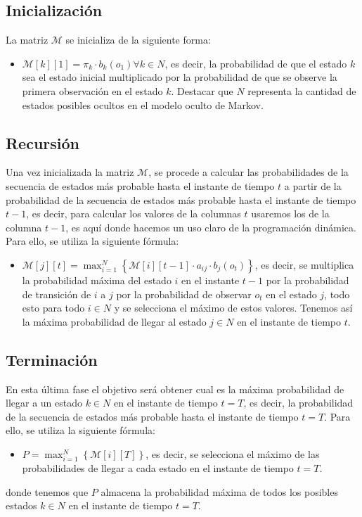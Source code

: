 \documentclass[11pt,openany]{book}
\begin{document}
\subsection{Inicialización}
La matriz $\mathscr{M}$ se inicializa de la siguiente forma:
\begin{itemize}
      \item $\mathscr{M}[k][1] = \pi_k \cdot b_k(o_1) \forall k \in N$, es decir, la probabilidad de que el estado $k$ sea el estado inicial multiplicado por la probabilidad de que se observe
      la primera observación en el estado $k$. Destacar que $N$ representa la cantidad de estados posibles ocultos en el modelo oculto de Markov.
\end{itemize}

\subsection{Recursión}
Una vez inicializada la matriz $\mathscr{M}$, se procede a calcular las probabilidades de la secuencia de estados más probable hasta el instante de tiempo $t$ a partir de la probabilidad
de la secuencia de estados más probable hasta el instante de tiempo $t-1$, es decir, para calcular los valores de la columnas $t$ usaremos los de la columna $t-1$, es aquí donde hacemos
un uso claro de la programación dinámica. Para ello, se utiliza la siguiente fórmula:
\begin{itemize}
      \item $\mathscr{M}[j][t] = \max_{i=1}^{N} \left\{ \mathscr{M}[i][t-1] \cdot a_{ij} \cdot b_j(o_t) \right\}$, es decir, se multiplica la probabilidad máxima del estado $i$ en
      el instante $t-1$ por la probabilidad de transición de $i$ a $j$ por la probabilidad de observar $o_t$ en el estado $j$, todo esto para todo $i\in N$ y se 
      selecciona el máximo de estos valores. Tenemos así la máxima probabilidad de llegar al estado $j\in N$ en el instante de tiempo $t$.
\end{itemize}
\subsection{Terminación}
En esta última fase el objetivo será obtener cual es la máxima probabilidad de llegar a un estado $k\in N$ en el instante de tiempo $t=T$, es decir, la probabilidad de la secuencia de estados
más probable hasta el instante de tiempo $t=T$. Para ello, se utiliza la siguiente fórmula:
\begin{itemize}
      \item $P = \max_{i=1}^{N} \left\{ \mathscr{M}[i][T] \right\}$, es decir, se selecciona el máximo de las probabilidades de llegar a cada estado en el instante de tiempo $t=T$.
\end{itemize}
donde tenemos que $P$ almacena la probabilidad máxima de todos los posibles estados $k\in N$ en el instante de tiempo $t=T$.
\end{document}
